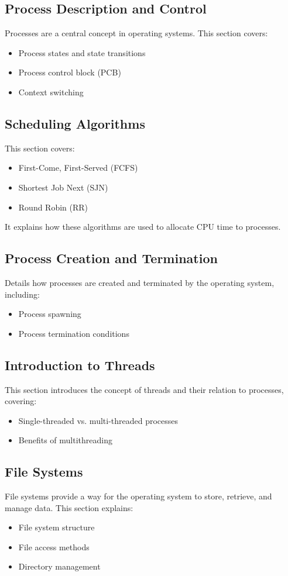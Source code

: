 \documentclass[12pt]{article}
\begin{document}
\subsection{Process Description and Control}
Processes are a central concept in operating systems. This section covers:
\begin{itemize}
    \item Process states and state transitions
    \item Process control block (PCB)
    \item Context switching
\end{itemize}

\subsection{Scheduling Algorithms}
This section covers:
\begin{itemize}
    \item First-Come, First-Served (FCFS)
    \item Shortest Job Next (SJN)
    \item Round Robin (RR)
\end{itemize}
It explains how these algorithms are used to allocate CPU time to processes.

\subsection{Process Creation and Termination}
Details how processes are created and terminated by the operating system, including:
\begin{itemize}
    \item Process spawning
    \item Process termination conditions
\end{itemize}

\subsection{Introduction to Threads}
This section introduces the concept of threads and their relation to processes, covering:
\begin{itemize}
    \item Single-threaded vs. multi-threaded processes
    \item Benefits of multithreading
\end{itemize}

\subsection{File Systems}
File systems provide a way for the operating system to store, retrieve, and manage data. This section explains:
\begin{itemize}
    \item File system structure
    \item File access methods
    \item Directory management
\end{itemize}
\end{document}

